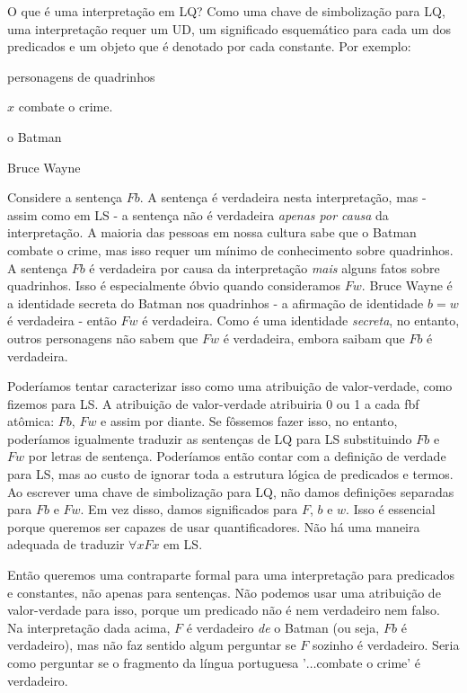 O que é uma interpretação em LQ? Como uma chave de simbolização para LQ, uma interpretação requer um UD, um significado esquemático para cada um dos predicados e um objeto que é denotado por cada constante. Por exemplo:
\begin{ekey}
\item[UD:] personagens de quadrinhos
\item[Fx:] $x$ combate o crime.
\item[b:] o Batman
\item[w:] Bruce Wayne
\end{ekey}
Considere a sentença $Fb$. A sentença é verdadeira nesta interpretação, mas - assim como em LS - a sentença não é verdadeira \emph{apenas por causa} da interpretação. A maioria das pessoas em nossa cultura sabe que o Batman combate o crime, mas isso requer um mínimo de conhecimento sobre quadrinhos. A sentença $Fb$ é verdadeira por causa da interpretação \emph{mais} alguns fatos sobre quadrinhos. Isso é especialmente óbvio quando consideramos $Fw$. Bruce Wayne é a identidade secreta do Batman nos quadrinhos - a afirmação de identidade $b=w$ é verdadeira - então $Fw$ é verdadeira. Como é uma identidade \emph{secreta}, no entanto, outros personagens não sabem que $Fw$ é verdadeira, embora saibam que $Fb$ é verdadeira.

Poderíamos tentar caracterizar isso como uma atribuição de valor-verdade, como fizemos para LS. A atribuição de valor-verdade atribuiria 0 ou 1 a cada fbf atômica: $Fb$, $Fw$ e assim por diante. Se fôssemos fazer isso, no entanto, poderíamos igualmente traduzir as sentenças de LQ para LS substituindo $Fb$ e $Fw$ por letras de sentença. Poderíamos então contar com a definição de verdade para LS, mas ao custo de ignorar toda a estrutura lógica de predicados e termos. Ao escrever uma chave de simbolização para LQ, não damos definições separadas para $Fb$ e $Fw$. Em vez disso, damos significados para $F$, $b$ e $w$. Isso é essencial porque queremos ser capazes de usar quantificadores. Não há uma maneira adequada de traduzir $\forall x Fx$ em LS.

Então queremos uma contraparte formal para uma interpretação para predicados e constantes, não apenas para sentenças. Não podemos usar uma atribuição de valor-verdade para isso, porque um predicado não é nem verdadeiro nem falso. Na interpretação dada acima, $F$ é verdadeiro \emph{de} o Batman (ou seja, $Fb$ é verdadeiro), mas não faz sentido algum perguntar se $F$ sozinho é verdadeiro. Seria como perguntar se o fragmento da língua portuguesa '$\ldots$combate o crime' é verdadeiro.

